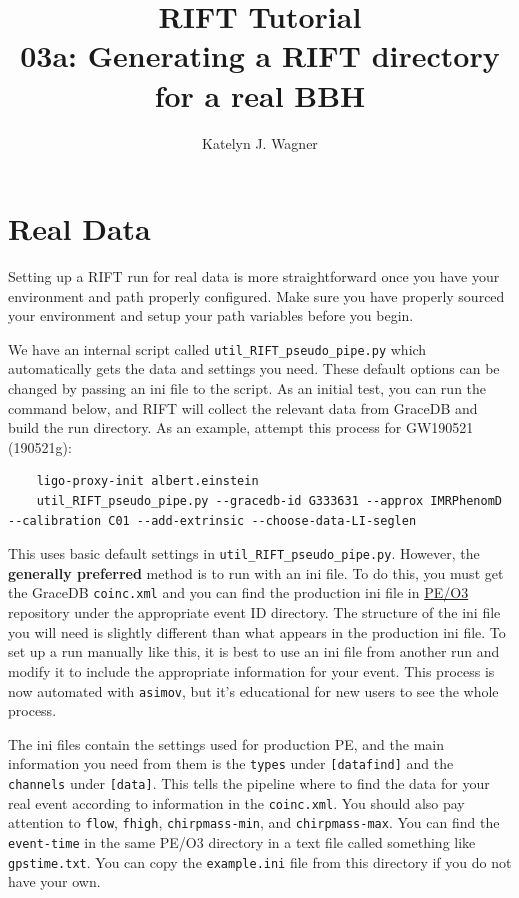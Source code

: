 \documentclass{article}
\title{RIFT Tutorial \\
\large 03a: Generating a RIFT directory for a real BBH}
\author{Katelyn J. Wagner}
\date{}
\begin{document}
\maketitle

\section*{Real Data}

Setting up a RIFT run for real data is more straightforward once you have your environment and path properly configured. Make sure you have properly sourced your environment and setup your path variables before you begin.

We have an internal script called \texttt{util\_RIFT\_pseudo\_pipe.py} which automatically gets the data and settings you need. These default options can be changed by passing an ini file to the script. As an initial test, you can run the command below, and RIFT will collect the relevant data from GraceDB and build the run directory. As an example, attempt this process for GW190521 (190521g):

\begin{verbatim}
    ligo-proxy-init albert.einstein
    util_RIFT_pseudo_pipe.py --gracedb-id G333631 --approx IMRPhenomD --calibration C01 --add-extrinsic --choose-data-LI-seglen
\end{verbatim}

This uses basic default settings in \texttt{util\_RIFT\_pseudo\_pipe.py}. However, the \textbf{generally preferred} method is to run with an ini file. To do this, you must get the GraceDB \texttt{coinc.xml} and you can find the production ini file in \href{https://git.ligo.org/pe/O3}{PE/O3} repository under the appropriate event ID directory. The structure of the ini file you will need is slightly different than what appears in the production ini file. To set up a run manually like this, it is best to use an ini file from another run and modify it to include the appropriate information for your event. This process is now automated with \texttt{asimov}, but it's educational for new users to see the whole process.

The ini files contain the settings used for production PE, and the main information you need from them is the \texttt{types} under \texttt{[datafind]} and the \texttt{channels} under \texttt{[data]}. This tells the pipeline where to find the data for your real event according to information in the \texttt{coinc.xml}. You should also pay attention to \texttt{flow}, \texttt{fhigh}, \texttt{chirpmass-min}, and \texttt{chirpmass-max}. You can find the \texttt{event-time} in the same PE/O3 directory in a text file called something like \texttt{gpstime.txt}. You can copy the \texttt{example.ini} file from this directory if you do not have your own.
\end{document}
